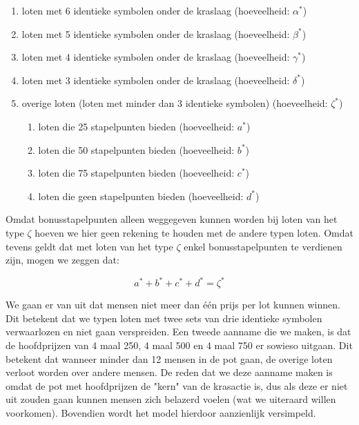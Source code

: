 \begin{enumerate}
    \item loten met 6 identieke symbolen onder de kraslaag (hoeveelheid: $\alpha^{*}$)
    \item loten met 5 identieke symbolen onder de kraslaag (hoeveelheid: $\beta^{*}$)
    \item loten met 4 identieke symbolen onder de kraslaag (hoeveelheid: $\gamma^{*}$)
    \item loten met 3 identieke symbolen onder de kraslaag (hoeveelheid: $\delta^{*}$)
    \item overige loten (loten met minder dan 3 identieke symbolen) (hoeveelheid: $\zeta^{*}$)
    \begin{enumerate}
    \item loten die 25 stapelpunten bieden (hoeveelheid: $a^{*}$)
    \item loten die 50 stapelpunten bieden (hoeveelheid: $b^{*}$)
    \item loten die 75 stapelpunten bieden (hoeveelheid: $c^{*}$)
    \item loten die geen stapelpunten bieden (hoeveelheid: $d^{*}$)
    \end{enumerate}
\end{enumerate}

Omdat bonusstapelpunten alleen weggegeven kunnen worden bij loten van het type $\zeta$ hoeven we hier geen rekening te houden met de andere typen loten. Omdat tevens geldt dat met loten van het type $\zeta$ enkel bonusstapelpunten te verdienen zijn, mogen we zeggen dat:

\begin{equation*}
  a^{*}+b^{*}+c^{*}+d^{*}=\zeta^{*}
\end{equation*}

We gaan er van uit dat mensen niet meer dan één prijs per lot kunnen winnen. Dit betekent dat we typen loten met twee sets van drie identieke symbolen verwaarlozen en niet gaan verspreiden. Een tweede aanname die we maken, is dat de hoofdprijzen van 4 maal 250, 4 maal 500 en 4 maal 750 er sowieso uitgaan. Dit betekent dat wanneer minder dan 12 mensen in de pot gaan, de overige loten verloot worden over andere mensen. De reden dat we deze aanname maken is omdat de pot met hoofdprijzen de "kern" van de krasactie is, dus als deze er niet uit zouden gaan kunnen mensen zich belazerd voelen (wat we uiteraard willen voorkomen). Bovendien wordt het model hierdoor aanzienlijk versimpeld.\\

